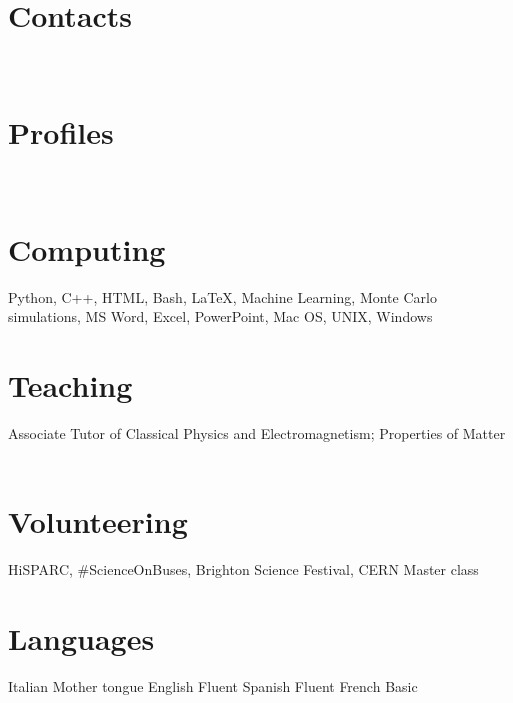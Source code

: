 \documentclass[print]{cv} %
\newcommand{\profilepic}[1]{\renewcommand{\profilepic}{#1}}
\newlength\imagewidth
\newlength\imagescale
\begin{document}


\begin{aside} %
  \section{Contacts}
    \cvmail
    \cvnumberphone
    \cvaddress
  ~
  \section{Profiles}
    \cvlinkedin
    \cvsussex
    \cvgit
    \cvsite
  ~
  \section{Computing} 
      Python, C++, HTML, Bash, \LaTeX,
      Machine Learning, 
      Monte Carlo simulations, 
      MS Word, Excel, PowerPoint,
      Mac OS, UNIX, Windows
  ~
  \section{Teaching}
    Associate Tutor of Classical Physics and Electromagnetism; Properties of Matter
  ~
  \section{Volunteering}
    HiSPARC, 
    \#ScienceOnBuses,
    Brighton Science Festival,
    CERN Master class
  ~
  \section{Languages}
    Italian Mother tongue
    English Fluent
    Spanish Fluent
    French Basic
  ~
\end{aside}
\end{document}
